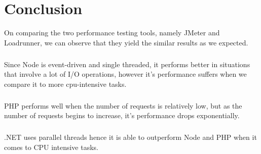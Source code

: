 \documentclass[../thesis.tex]{subfiles}
\begin{document}
\chapter{Conclusion}
On comparing the two performance testing tools, namely JMeter and Loadrunner, we can observe that they yield the similar results as we expected.
\paragraph{}
Since Node is event-driven and single threaded, it performs better in situations that involve a lot of I/O operations, however it's performance suffers when we compare it to more cpu-intensive tasks.
\paragraph{}
PHP performs well when the number of requests is relatively low, but as the number of requests begins to increase, it's performance drops exponentially.
\paragraph{}
.NET uses parallel threads hence it is able to outperform Node and PHP when it comes to CPU intensive tasks.
\end{document}
